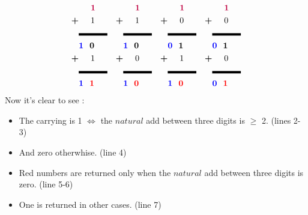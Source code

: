 \documentclass[12pt, twoside, a4paper]{article}
\begin{document}
    \begin{align*}
      &\hspace{.5cm}\textcolor{purple}{\textbf{1}}      &    &\hspace{.5cm}\textcolor{purple}{\textbf{1}}  &  &\hspace{.5cm}\textcolor{purple}{\textbf{1}}  &  &\hspace{.5cm}\textcolor{purple}{\textbf{1}}\\
      \textbf{+}&\hspace{.5cm}1      &    \textbf{+}&\hspace{.5cm}1  &  \textbf{+}&\hspace{.5cm}0  &  \textbf{+}&\hspace{.5cm}0\\
      &\rule{1.2cm}{.1cm} &&\rule{1.2cm}{.1cm}&&\rule{1.2cm}{.1cm}&&\rule{1.2cm}{.1cm}\\
      &\textcolor{blue}{\textbf{1}}\hspace{.25cm}\textbf{0} &&\textcolor{blue}{\textbf{1}}\hspace{.25cm}\textbf{0} && \textcolor{blue}{\textbf{0}}\hspace{.25cm}\textbf{1} && \textcolor{blue}{\textbf{0}}\hspace{.25cm}\textbf{1}\\
      \textbf{+}&\hspace{.5cm}1     &   \textbf{+}&\hspace{.5cm}0  & \textbf{+}&\hspace{.5cm}1  & \textbf{+}&\hspace{.5cm}0\\
      &\rule{1.2cm}{.1cm} &&\rule{1.2cm}{.1cm}&&\rule{1.2cm}{.1cm}&&\rule{1.2cm}{.1cm}\\
      &\textcolor{blue}{\textbf{1}}\hspace{.25cm}\textcolor{red}{\textbf{1}} &&\textcolor{blue}{\textbf{1}}\hspace{.25cm}\textcolor{red}{\textbf{0}} && \textcolor{blue}{\textbf{1}}\hspace{.25cm}\textcolor{red}{\textbf{0}} && \textcolor{blue}{\textbf{0}}\hspace{.25cm}\textcolor{red}{\textbf{1}}
    \end{align*}
    Now it's clear to see :
    \begin{itemize}
    \item The carrying is 1 $\iff$ the $natural$ add between three digits is $\geq$ 2. (lines 2-3)
    \item And zero otherwhise. (line 4)
    \item Red numbers are returned only when the $natural$ add between three digits is zero. (line 5-6)
    \item One is returned in other cases. (line 7)
    \end{itemize}
\end{document}

